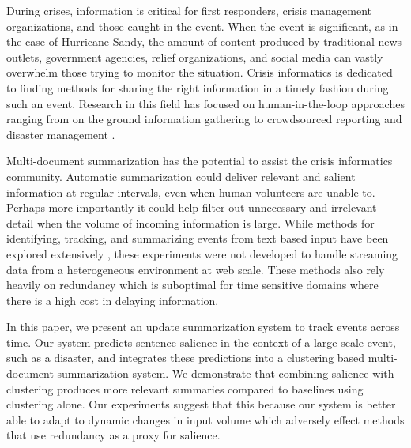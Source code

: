 \label{sec:introduction}
During crises, information is critical for first responders,
 crisis management organizations, and those caught in the event.  
When the event is significant, as in the case of Hurricane
Sandy, the amount of content produced by traditional news outlets,
government agencies, relief organizations, and social media can vastly
overwhelm those trying to monitor the situation. 
Crisis informatics \cite{palen2010vision} is dedicated to finding methods for sharing the
right information in a timely fashion during such an event.
Research in this field has focused on
human-in-the-loop approaches ranging from on the ground information 
gathering to crowdsourced reporting and disaster management \cite{starbird2013working}.

Multi-document summarization has the potential to assist the crisis 
informatics community. 
Automatic summarization could deliver
relevant and salient information at regular intervals, 
even when human volunteers are unable to. 
Perhaps more importantly it could help filter out
unnecessary and irrelevant detail when the volume of incoming information
is large. 
While methods for identifying,
tracking, and summarizing events from text based input have been explored
extensively
\cite{allan1998topic,Filatova&Hatzivassiloglou.04a,Wang&al.11}, 
these experiments were not developed to handle streaming data from a
 heterogeneous environment at web scale. 
These methods also rely heavily on redundancy which is suboptimal for time
sensitive domains where there is a high cost in delaying information.

In this paper, we present an update summarization system to track events
across time. Our system predicts sentence salience in the context of a
large-scale event, such as a disaster, and integrates these predictions into
a clustering based multi-document summarization system. 
We demonstrate that combining salience with clustering produces more relevant summaries
compared to baselines using clustering alone.  
Our experiments suggest that this
because our system is better able to adapt to
dynamic changes in input volume which adversely 
effect methods that use redundancy as a proxy for salience. 


